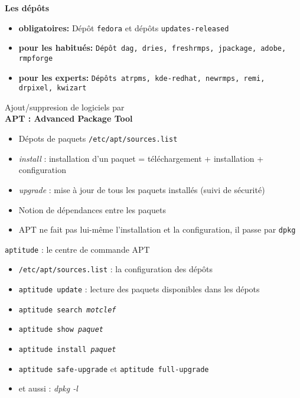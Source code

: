 \documentclass[french]{beamer}
\begin{document}
\begin{frame}
\textbf{Les dépôts}
\begin{itemize}
\item \textbf{obligatoires: } Dépôt \texttt{fedora} et dépôts
\texttt{updates-released}
\item \textbf{pour les habitués:} \texttt{Dépôt dag, dries, freshrmps, jpackage, adobe,
rmpforge}
\item \textbf{pour les experts:} \texttt{Dépôts atrpms, kde-redhat, newrmps,
remi, drpixel, kwizart}
\end{itemize}
\end{frame}


\begin{frame}
\begin{center}
Ajout/suppresion de logiciels par\\
\textbf{APT : Advanced Package Tool}
\end{center}
\begin{itemize}
\item Dépots de paquets \texttt{/etc/apt/sources.list}
\item \textit{install} : installation d'un paquet = téléchargement + installation + configuration 
\item \textit{upgrade} : mise à jour de tous les paquets installés (suivi de sécurité)
\item Notion de dépendances entre les paquets
\item APT ne fait pas lui-même l'installation et la configuration, il passe par \texttt{dpkg}
\end{itemize}
\end{frame}

\begin{frame}
\begin{center}
\texttt{aptitude} : le centre de commande APT
\end{center}
\begin{itemize}
\item \texttt{/etc/apt/sources.list} : la configuration des dépôts
\item \texttt{aptitude update} : lecture des paquets disponibles dans les dépots 
\item \texttt{aptitude search \textit{motclef}}
\item \texttt{aptitude show \textit{paquet}}
\item \texttt{aptitude install \textit{paquet}} 
\item \texttt{aptitude safe-upgrade} et  \texttt{aptitude full-upgrade}
\item et aussi : \textit{dpkg -l}
\end{itemize}
\end{frame}
\end{document}
